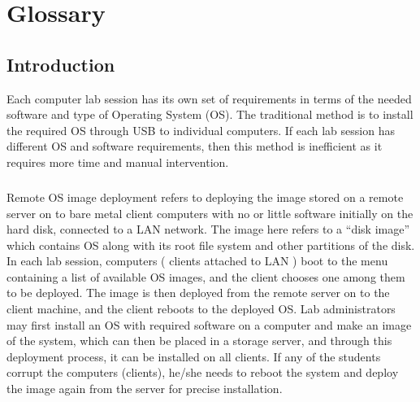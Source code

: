 \documentclass[a4paper,12pt]{article}
\begin{document}

\newpage
\tableofcontents
\chapter{Glossary}


\newpage
\listoffigures
\listoftables


\newpage    
        


\section{\fontsize{16pt}{1em} Introduction}
Each computer lab session has its own set of requirements in terms of the needed software and type of Operating System (OS). The traditional method is to install the required OS through USB to individual computers. If each lab session has different OS and software requirements, then this method is inefficient as it requires more time and manual intervention.
\paragraph{}
Remote OS image deployment refers to deploying the image stored on a remote server on to bare metal client computers with no or little software initially on the hard disk,  connected to a LAN  network. The image here refers to a “disk image” which contains OS along with its root file system and other partitions of the disk. 
In each lab session, computers ( clients attached to LAN ) boot to the menu containing a list of available OS images, and the client chooses one among them to be deployed. The image is then deployed from the remote server on to the client machine, and the client reboots to the deployed OS. Lab administrators may first install an OS with required software on a computer and make an image of the system, which can then be placed in a storage server, and through this deployment process, it can be installed on all clients. If any of the students corrupt the computers (clients), he/she needs to reboot the system and deploy the image again from the server for precise installation. 
\vspace{0.5cm}
\end{document}
